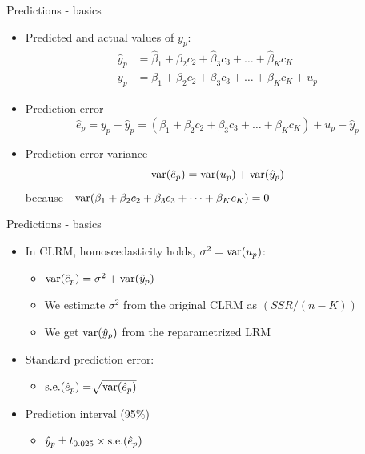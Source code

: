 \documentclass{beamer}
\begin{document}

\begin{frame}{Predictions - basics}
\begin{itemize}
\item Predicted and actual values of $y_p$:
\begin{align}\nonumber
\hat{y}_p &  = \hat{\beta}_1 + \hat{\beta}_2 c_2 + \hat{\beta}_3 c_3 + \dots + \hat{\beta}_K c_K\\ \nonumber
y_p & = \beta_1 + \beta_2 c_2 + \beta_3 c_3 + \dots+\beta_K c_K + u_p \nonumber
\end{align} 
\item Prediction error
$$\hat{e}_p = y_p - \hat{y}_p = (\beta_1 + \beta_2 c_2 + \beta_3 c_3 + \dots+\beta_K c_K) + u_p - \hat{y}_p$$
\item Prediction error variance
$$\textnormal{var}(\hat{e}_p) = \textnormal{var}(u_p) + \textnormal{var}(\hat{y}_p)$$
because~~$\textnormal{var}(\beta_1 + \beta_2 c_2 + \beta_3 c_3 + \dots+\beta_K c_K)=0$
\end{itemize}
\end{frame}


\begin{frame}{Predictions - basics}
\begin{itemize}
\item In CLRM, homoscedasticity holds, $\sigma^2 = \textnormal{var}(u_p)$: \\

\begin{itemize}
\item $\textnormal{var}(\hat{e}_p) = \sigma^2 + \textnormal{var}(\hat{y}_p)$
\vspace{0.2cm}
\item We estimate $\sigma^2$ from the original CLRM as $(\textit{SSR}/(n-K))$
\vspace{0.2cm}
\item We get $\textnormal{var}(\hat{y}_p)$ from the reparametrized LRM
\end{itemize}
\vspace{0.5cm}
\item Standard prediction error:
\begin{itemize}
\vspace{0.2cm}
 \item $\textnormal{s.e.}(\hat{e}_p) = \sqrt[]{\textnormal{var}(\hat{e}_p)}$
\end{itemize}
\vspace{0.5cm}
\item Prediction interval (95\%)
\vspace{0.2cm}
\begin{itemize}
\item $\hat{y}_p \pm t_{0.025} \times \textnormal{s.e.}(\hat{e}_p) $
\end{itemize}
\end{itemize}
\end{frame}
\end{document}
